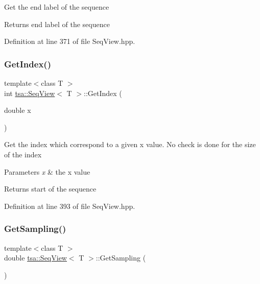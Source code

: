 Get the end label of the sequence

\begin{DoxyReturn}{Returns}
end label of the sequence 
\end{DoxyReturn}


Definition at line 371 of file Seq\+View.\+hpp.

\mbox{\label{classtsa_1_1_seq_view_a4e03aa960de613cab9b59b3e726d7460}} 
\subsubsection{\texorpdfstring{Get\+Index()}{GetIndex()}}
{\footnotesize\ttfamily template$<$class T $>$ \\
int \hyperlink{classtsa_1_1_seq_view}{tsa\+::\+Seq\+View}$<$ T $>$\+::Get\+Index (\begin{DoxyParamCaption}\item[{double}]{x }\end{DoxyParamCaption})\hspace{0.3cm}{\ttfamily [inline]}}

Get the index which correspond to a given x value. No check is done for the size of the index


\begin{DoxyParams}{Parameters}
{\em x} & the x value\\
\hline
\end{DoxyParams}
\begin{DoxyReturn}{Returns}
start of the sequence 
\end{DoxyReturn}


Definition at line 393 of file Seq\+View.\+hpp.

\mbox{\label{classtsa_1_1_seq_view_a6da2cdab5d792d58c43fea2415787868}} 
\subsubsection{\texorpdfstring{Get\+Sampling()}{GetSampling()}}
{\footnotesize\ttfamily template$<$class T $>$ \\
double \hyperlink{classtsa_1_1_seq_view}{tsa\+::\+Seq\+View}$<$ T $>$\+::Get\+Sampling (\begin{DoxyParamCaption}{ }\end{DoxyParamCaption})\hspace{0.3cm}{\ttfamily [inline]}}

